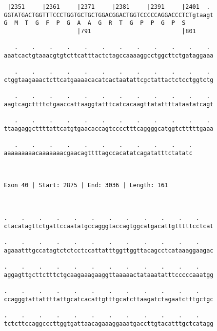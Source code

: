 \documentclass{article}
\begin{document}
\begin{Verbatim}
 |2351     |2361     |2371     |2381     |2391     |2401  . 
GGTATGACTGGTTTCCCTGGTGCTGCTGGACGGACTGGTCCCCCAGGACCCTCTgtaagt
G  M  T  G  F  P  G  A  A  G  R  T  G  P  P  G  P  S        
                     |791                          |801     
  
   .    .    .    .    .    .    .    .    .    .    .    . 
aaatcactgtaaacgtgtcttcatttactctagccaaaaggcctggcttctgataggaaa
                                                            
   .    .    .    .    .    .    .    .    .    .    .    . 
ctggtaagaaactcttcatgaaaacacatcactaatattcgctattactctcctggtctg
                                                            
   .    .    .    .    .    .    .    .    .    .    .    . 
aagtcagcttttctgaaccattaaggtatttcatcacaagttatattttataatatcagt
                                                            
   .    .    .    .    .    .    .    .    .    .    .    . 
ttaagaggcttttattcatgtgaacaccagtcccctttcaggggcatggtctttttgaaa
                                                            
   .    .    .    .    .    .    .    .    .    .    .
aaaaaaaaacaaaaaaacgaacagttttagccacatatcagatatttctatatc
                                                      
                                                      
 
Exon 40 | Start: 2875 | End: 3036 | Length: 161



.    .    .    .    .    .    .    .    .    .    .    .    
ctacatagttctgattccaatatgccagggtaccagtggcatgacattgtttttcctcat
                                                            
.    .    .    .    .    .    .    .    .    .    .    .    
agaaatttgccatagtctctcctccattatttggttggttacagcctcataaaggaagac
                                                            
.    .    .    .    .    .    .    .    .    .    .    .    
aggagttgcttctttctgcaagaaagaaggttaaaaactataaatatttcccccaaatgg
                                                            
.    .    .    .    .    .    .    .    .    .    .    .    
ccagggtattattttattgcatcacattgtttgcatcttaagatctagaatctttgctgc
                                                            
.    .    .    .    .    .    .    .    .    .    .    .    
tctcttccaggcccttggtgattaacagaaaggaaatgaccttgtacatttgctcatagg
                                                            

\end{Verbatim}
\end{document}
